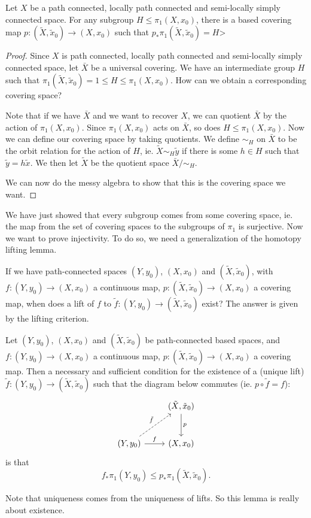 \documentclass[a4paper]{article}
\begin{document}
\begin{prop}
  Let $X$ be a path connected, locally path connected and semi-locally simply connected space. For any subgroup $H \leq \pi_1(X, x_0)$, there is a based covering map $p: (\tilde{X}, \tilde{x}_0)\to (X, x_0)$ such that $p_* \pi_1(\tilde{X}, \tilde{x}_0) = H$>
\end{prop}

\begin{proof}
  Since $X$ is path connected, locally path connected and semi-locally simply connected space, let $\bar{X}$ be a universal covering. We have an intermediate group $H$ such that $\pi_1(\tilde{X}, \tilde{x}_0) = 1 \leq H \leq \pi_1(X, x_0)$. How can we obtain a corresponding covering space?

  Note that if we have $\bar{X}$ and we want to recover $X$, we can quotient $\bar{X}$ by the action of $\pi_1(X, x_0)$. Since $\pi_1(X, x_0)$ acts on $\bar{X}$, so does $H \leq \pi_1(X, x_0)$. Now we can define our covering space by taking quotients. We define $\sim_H$ on $\bar{X}$ to be the orbit relation for the action of $H$, ie. $\tilde{X} \sim_H \tilde{y}$ if there is some $h \in H$ such that $\tilde{y} = h\tilde{x}$. We then let $\tilde{X}$ be the quotient space $\bar{X}/{\sim_H}$.

  We can now do the messy algebra to show that this is the covering space we want.
\end{proof}
We have just showed that every subgroup comes from some covering space, ie. the map from the set of covering spaces to the subgroups of $\pi_1$ is surjective. Now we want to prove injectivity. To do so, we need a generalization of the homotopy lifting lemma.

If we have path-connected spaces $(Y, y_0)$, $(X, x_0)$ and $(\tilde{X}, \tilde{x}_0)$, with $f: (Y, y_0) \to (X, x_0)$ a continuous map, $p: (\tilde{X}, \tilde{x}_0) \to (X, x_0)$ a covering map, when does a lift of $f$ to $\tilde{f}: (Y, y_0) \to (\tilde{X}, \tilde{x}_0)$ exist? The answer is given by the lifting criterion.

\begin{lemma}
  Let $(Y, y_0)$, $(X, x_0)$ and $(\tilde{X}, \tilde{x}_0)$ be path-connected based spaces, and $f: (Y, y_0) \to (X, x_0)$ a continuous map, $p: (\tilde{X}, \tilde{x}_0) \to (X, x_0)$ a covering map. Then a necessary and sufficient condition for the existence of a (unique lift) $\tilde{f}: (Y, y_0) \to (\tilde{X}, \tilde{x}_0)$ such that the diagram below commutes (ie. $p\circ \tilde{f} = f$):
  \[
    \begin{tikzcd}[row sep=large]
      & (\tilde{X}, \tilde{x}_0) \ar[d, "p"]\\
      (Y, y_0) \ar [r, "f"] \ar [ru, dashed, "\tilde{f}"] & (X, x_0)
    \end{tikzcd}
  \]
  is that
  \[
    f_* \pi_1(Y, y_0) \leq p_*\pi_1(\tilde{X}, \tilde{x}_0).
  \]
\end{lemma}
Note that uniqueness comes from the uniqueness of lifts. So this lemma is really about existence.
\end{document}
